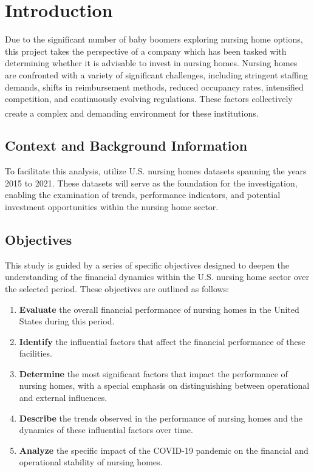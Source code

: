 \documentclass{article}
\theoremstyle{mytheoremstyle}
\theoremstyle{mytheoremstyle}
\theoremstyle{myproblemstyle}
\begin{document}
\section{Introduction}

Due to the significant number of baby boomers exploring nursing home options, this project takes the perspective of a company which has been tasked with determining whether it is advisable to invest in nursing homes. Nursing homes are confronted with a variety of significant challenges, including stringent staffing demands, shifts in reimbursement methods, reduced occupancy rates, intensified competition, and continuously evolving regulations. These factors collectively create a complex and demanding environment for these institutions.\textsuperscript{\cite{tyler2017rebalance}}

\subsection{Context and Background Information}

To facilitate this analysis, utilize U.S. nursing homes datasets spanning the years 2015 to 2021. These datasets will serve as the foundation for the investigation, enabling the examination of trends, performance indicators, and potential investment opportunities within the nursing home sector.

\subsection{Objectives}

This study is guided by a series of specific objectives designed to deepen the understanding of the financial dynamics within the U.S. nursing home sector over the selected period. These objectives are outlined as follows:

\begin{enumerate}
    \item \textbf{Evaluate} the overall financial performance of nursing homes in the United States during this period.
    \item \textbf{Identify} the influential factors that affect the financial performance of these facilities.
    \item \textbf{Determine} the most significant factors that impact the performance of nursing homes, with a special emphasis on distinguishing between operational and external influences.
    \item \textbf{Describe} the trends observed in the performance of nursing homes and the dynamics of these influential factors over time.
    \item \textbf{Analyze} the specific impact of the COVID-19 pandemic on the financial and operational stability of nursing homes.
\end{enumerate}
\end{document}
